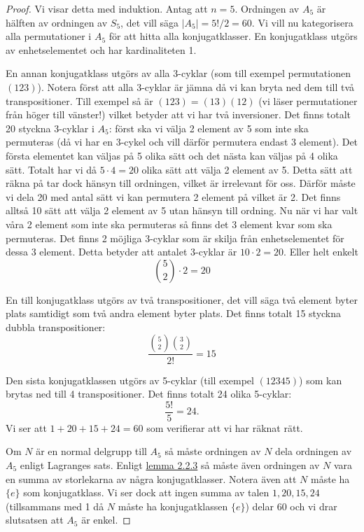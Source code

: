 \documentclass{article}
\theoremstyle{definition}
\begin{document}
\begin{proof}
  Vi visar detta med induktion. Antag att $n = 5$. Ordningen av $A_5$ är hälften av ordningen av $S_5$, det vill säga $|A_5| = 5!/2 = 60$.
  Vi vill nu kategorisera alla permutationer i $A_5$ för att hitta alla konjugatklasser. En konjugatklass utgörs av enhetselementet och 
  har kardinaliteten 1. 
  
  En annan konjugatklass utgörs av alla 3-cyklar (som till exempel permutationen $(123)$).  
  Notera först att alla 3-cyklar är jämna då vi kan bryta ned dem till två transpositioner. Till exempel så är $(123) = (13)(12)$ 
  (vi läser permutationer från höger till vänster!) vilket betyder att vi har två inversioner. 
  Det finns totalt 20 styckna 3-cyklar i $A_5$: först ska vi välja 2 element av 5 som inte ska permuteras 
  (då vi har en 3-cykel och vill därför permutera endast 3 element). 
  Det första elementet kan väljas på 5 olika sätt och det nästa kan väljas på 4 olika sätt. Totalt har vi då $5 \cdot 4 = 20$ olika sätt 
  att välja 2 element av 5. Detta sätt att räkna på tar dock hänsyn till ordningen, vilket är irrelevant för oss. Därför måste 
  vi dela 20 med antal sätt vi kan permutera 2 element på vilket är 2. Det finns alltså 10 sätt att välja 2 element av 5 utan hänsyn till ordning. 
  Nu när vi har valt våra 2 element som inte ska permuteras så finns det 3 element kvar som ska permuteras. Det finns 2 möjliga 
  3-cyklar som är skilja från enhetselementet för dessa 3 element. 
  Detta betyder att antalet 3-cyklar är $10 \cdot 2 = 20.$ Eller helt enkelt 
  \[\binom{5}{2} \cdot 2 = 20\]

  En till konjugatklass utgörs av två transpositioner, det vill säga två element byter plats samtidigt som två andra element byter plats. 
  Det finns totalt 15 styckna dubbla transpositioner: 
  $$\frac{\binom{5}{2} \binom{3}{2}}{2!} = 15$$

  Den sista konjugatklassen utgörs av 5-cyklar (till exempel $(12345)$) som kan brytas ned till 4 transpositioner. Det finns totalt 
  24 olika 5-cyklar:
  \[\frac{5!}{5} = 24.\]
  Vi ser att $1 + 20 + 15 + 24 = 60$ som verifierar att vi har räknat rätt.

  Om $N$ är en normal delgrupp till $A_5$ så måste ordningen av $N$ dela ordningen av $A_5$ enligt Lagranges sats. 
  Enligt \hyperlink{lemma3.2.3}{lemma 2.2.3} så måste även ordningen av $N$ vara en summa av storlekarna av några konjugatklasser. 
  Notera även att $N$ måste ha $\{e\}$ som konjugatklass.
  Vi ser dock att ingen summa av talen $1, 20, 15, 24$ (tillsammans med 1 då $N$ måste ha konjugatklassen $\{e\}$) 
  delar 60 och vi drar slutsatsen att $A_5$ är enkel. 


\end{proof}
\end{document}
